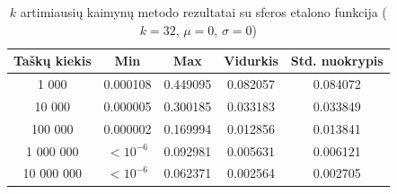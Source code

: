 \begin{table}[H]
    \centering
    \begin{tabular}{|c|c|c|c|c|}
        \hline
        \textbf{Taškų kiekis} & \textbf{Min} & \textbf{Max} & \textbf{Vidurkis} & \textbf{Std. nuokrypis} \\ \hline
        1 000        & 0.000108 & 0.449095 & 0.082057 & 0.084072 \\ \hline
        10 000       & 0.000005 & 0.300185 & 0.033183 & 0.033849 \\ \hline
        100 000      & 0.000002 & 0.169994 & 0.012856 & 0.013841 \\ \hline
        1 000 000    & $<10^{-6}$ & 0.092981 & 0.005631 & 0.006121 \\ \hline
        10 000 000   & $<10^{-6}$ & 0.062371 & 0.002564 & 0.002705 \\ \hline
    \end{tabular}
    \caption{$k$ artimiausių kaimynų metodo rezultatai su sferos etalono funkcija ($k = 32$, $\mu = 0$, $\sigma = 0$)}
\end{table}